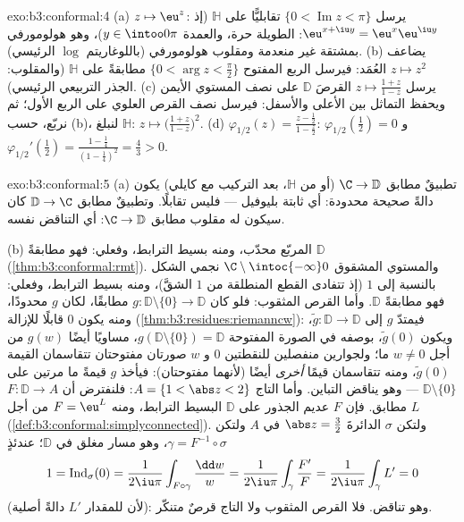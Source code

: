 \begin{solution}{exo:b3:conformal:4}
(a) $z \mapsto \eu^z$: يرسل $\{0 < \operatorname{Im}z <
\pi\}$ تقابليًّا على $\mathbb H$ (إذ $\eu^{x+\iu y} =
\eu^x\eu^{\iu y}$:
الطويلة حرة، والعمدة $y \in
\intoo0\pi$)، وهو هولومورفي بمشتقة غير منعدمة
ومقلوب هولومورفي (باللوغاريتم $\log$ الرئيسي).
(b) يضاعف $z \mapsto z^2$ العُمَد: فيرسل الربع المفتوح $\{0 < \arg z < \frac\pi2\}$
مطابقةً على $\mathbb
H$ (والمقلوب: الجذر التربيعي الرئيسي).
(c) يرسل $z \mapsto \frac{1 + z}{1 - z}$ القرصَ $\mathbb D$ على نصف المستوي الأيمن ويحفظ
التماثل بين الأعلى والأسفل: فيرسل نصف القرص العلوي على الربع
الأول؛ ثم نربّع، حسب (b)، لنبلغ $\mathbb H$: $z \mapsto \bigl(\frac{1
+ z}{1 - z}\bigr)^2$.
(d)  $\varphi_{1/2}(z) = \frac{z -
\frac12}{1 - \frac z2}$: $\varphi_{1/2}(\tfrac12) = 0$ و $\varphi_{1/2}'(\tfrac12) = \frac{1 - \frac14}{(1 -
\frac14)^2} = \frac43 > 0$.
\end{solution}

\begin{solution}{exo:b3:conformal:5}
(a) تطبيقٌ مطابق $\C \to \mathbb D$ (أو من $\mathbb H$، بعد التركيب مع
كايلي) يكون دالةً صحيحة محدودة: أي ثابتة بليوفيل --- فليس
تقابلًا. وتطبيقٌ مطابق $\mathbb
D \to \C$ كان سيكون له مقلوب مطابق $\C \to \mathbb D$:
أي التناقض نفسه.

(b) المربّع محدّب، ومنه بسيط الترابط، وفعلي: فهو مطابقةً
$\mathbb D$ (\cref{thm:b3:conformal:rmt}). والمستوي المشقوق $\C\setminus\intoc{-\infty}0$ نجمي الشكل
بالنسبة إلى $1$ (إذ تتفادى القطع المنطلقة من $1$ الشقَّ)، ومنه
بسيط الترابط، وفعلي: فهو مطابقةً $\mathbb D$. وأما القرص
المثقوب: فلو كان $g \colon \mathbb D\setminus\{0\} \to \mathbb D$ مطابقًا، لكان $g$ محدودًا، ومنه يكون
$0$ قابلًا للإزالة (\cref{thm:b3:residues:riemanncw}): فيمتدّ $g$ إلى $\tilde g
\colon \mathbb D \to \mathbb D$، ويكون
$\tilde g(0)$، بوصفه في الصورة المفتوحة $g(\mathbb D\setminus\{0\}) = \mathbb D$، مساويًا أيضًا
$g(w)$ من أجل $w \neq 0$ ما؛ ولجوارين منفصلين للنقطتين $0$
و $w$ صورتان مفتوحتان تتقاسمان القيمة $\tilde g(0)$، ومنه
تتقاسمان قيمًا \emph{أخرى} أيضًا (لأنهما مفتوحتان): فيأخذ $g$
قيمةً ما مرتين على $\mathbb D\setminus\{0\}$ --- وهو يناقض التباين. وأما التاج
$A = \{1 < \abs z < 2\}$: فلنفترض أن $F \colon \mathbb D
\to A$ مطابق. فإن $F$ عديم الجذور على
$\mathbb D$ البسيط الترابط، ومنه $F = \eu^L$ من أجل $L$
 (\cref{def:b3:conformal:simplyconnected}). ولتكن $\sigma$ الدائرةَ $\abs z = \frac32$ في $A$
ولتكن $\gamma =
F^{-1}\circ\sigma$، وهو مسار مغلق في $\mathbb D$؛ عندئذٍ
\[
1 = \operatorname{Ind}_\sigma(0)
= \frac1{2\iu\pi}\int_{F\circ\gamma}\frac{\dd w}{w}
= \frac1{2\iu\pi}\int_\gamma\frac{F'}{F}
= \frac1{2\iu\pi}\int_\gamma L' = 0
\]
(لأن للمقدار $L'$ دالةً أصلية): وهو تناقض. فلا القرص المثقوب ولا
التاج قرصٌ متنكّر.
\end{solution}

